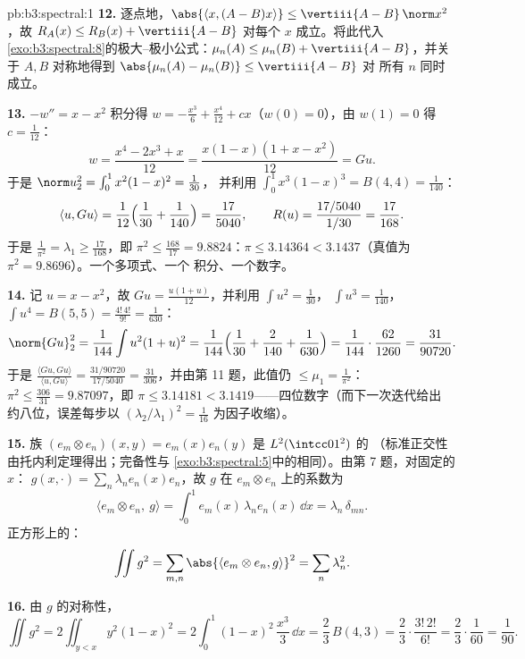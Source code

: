 \begin{solution}{pb:b3:spectral:1}
\textbf{12.} 逐点地，$\abs{\langle x, (A - B)x\rangle}
\leq \vertiii{A - B}\,\norm x^2$，故 $R_A(x) \leq R_B(x) +
\vertiii{A - B}$ 对每个 $x$ 成立。将此代入
\cref{exo:b3:spectral:8}的极大–极小公式：$\mu_n(A)
\leq \mu_n(B) + \vertiii{A - B}$，并关于 $A,
B$ 对称地得到 $\abs{\mu_n(A) - \mu_n(B)} \leq \vertiii{A - B}$ 对
所有 $n$ 同时成立。

\textbf{13.} $-w'' = x - x^2$ 积分得 $w = -\frac{x^3}6
+ \frac{x^4}{12} + cx$（$w(0) = 0$），由 $w(1) = 0$
得 $c = \frac1{12}$：
\[
w = \frac{x^4 - 2x^3 + x}{12} = \frac{x(1-x)(1 + x -
x^2)}{12} = Gu .
\]
于是 $\norm u_2^2 = \int_0^1x^2(1-x)^2 = \frac1{30}$，
并利用 $\int_0^1x^3(1-x)^3 = B(4,4) = \frac1{140}$：
\[
\langle u, Gu\rangle = \frac1{12}\Bigl(\frac1{30} +
\frac1{140}\Bigr) = \frac{17}{5040},
\qquad
R(u) = \frac{17/5040}{1/30} = \frac{17}{168} .
\]
于是 $\frac1{\pi^2} = \lambda_1 \geq \frac{17}{168}$，即
$\pi^2 \leq \frac{168}{17} = 9.8824$：$\pi \leq 3.14364 <
3.1437$（真值为 $\pi^2 = 9.8696$）。一个多项式、一个
积分、一个数字。

\textbf{14.} 记 $u = x - x^2$，故 $Gu =
\frac{u(1 + u)}{12}$，并利用 $\int u^2 = \frac1{30}$，
$\int u^3 = \frac1{140}$，$\int u^4 = B(5,5) =
\frac{4!\,4!}{9!} = \frac1{630}$：
\[
\norm{Gu}_2^2 = \frac1{144}\int u^2(1+u)^2 =
\frac1{144}\Bigl(\frac1{30} + \frac2{140} +
\frac1{630}\Bigr) = \frac1{144}\cdot\frac{62}{1260} =
\frac{31}{90720} .
\]
于是 $\frac{\langle Gu, Gu\rangle}{\langle u, Gu\rangle} =
\frac{31/90720}{17/5040} = \frac{31}{306}$，并由第
11 题，此值仍 $\leq \mu_1 = \frac1{\pi^2}$：$\pi^2 \leq
\frac{306}{31} = 9.87097$，即 $\pi \leq 3.14181 <
3.1419$——四位数字（而下一次迭代给出
约八位，误差每步以
$(\lambda_2/\lambda_1)^2 = \frac1{16}$ 为因子收缩）。

\textbf{15.} 族 $(e_m \otimes e_n)(x,y) =
e_m(x)e_n(y)$ 是 $L^2(\intcc01^2)$ 的
（标准正交性由托内利定理得出；完备性与
\cref{exo:b3:spectral:5}中的相同）。由第 7 题，对固定的 $x$：
$g(x, \cdot) = \sum_n\lambda_ne_n(x)e_n$，故
$g$ 在 $e_m\otimes e_n$ 上的系数为
\[
\langle e_m\otimes e_n,\ g\rangle
= \int_0^1 e_m(x)\,\lambda_n e_n(x)\,\dd x
= \lambda_n\,\delta_{mn} .
\]
正方形上的：
\[
\iint g^2 = \sum_{m,n}\abs{\langle e_m\otimes e_n,
g\rangle}^2 = \sum_n\lambda_n^2 .
\]

\textbf{16.} 由 $g$ 的对称性，
\[
\iint g^2 = 2\iint_{y<x}y^2(1-x)^2
= 2\int_0^1(1-x)^2\,\frac{x^3}3\,\dd x
= \frac23\,B(4, 3) = \frac23\cdot\frac{3!\,2!}{6!}
= \frac23\cdot\frac1{60} = \frac1{90} .
\]


\end{solution}
